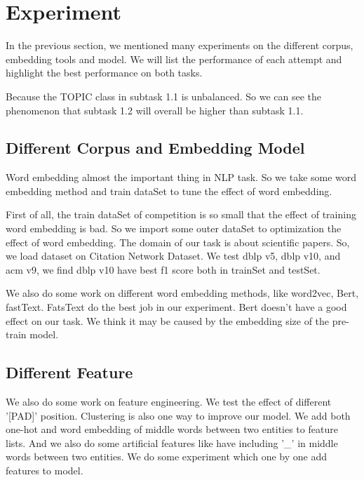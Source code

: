 \section{Experiment}
\label{sec:experiment}

In the previous section, we mentioned many experiments on the different corpus, embedding tools and model. We will list the performance of each attempt and highlight the best performance on both tasks.

Because the TOPIC class in subtask 1.1 is unbalanced. So we can see the phenomenon that subtask 1.2 will overall be higher than subtask 1.1.

\subsection{Different Corpus and Embedding Model}
\label{sec:different_corpus_and_embedding_model}

Word embedding almost the important thing in NLP task. So we take some word embedding method and train dataSet to tune the effect of word embedding.

First of all, the train dataSet of competition is so small that the effect of training word embedding is bad. So we import some outer dataSet to optimization the effect of word embedding. The domain of our task is about scientific papers. So, we load dataset on Citation Network Dataset. We test dblp v5, dblp v10, and acm v9, we find dblp v10 have best f1 score both in trainSet and testSet.

We also do some work on different word embedding methods, like word2vec, Bert, fastText. FatsText do the best job in our experiment. Bert doesn't have a good effect on our task. We think it may be caused by the embedding size of the pre-train model.



\subsection{Different Feature}
\label{sec:different_feature}

We also do some work on feature engineering. We test the effect of different '[PAD]' position. Clustering is also one way to improve our model. We add both one-hot and word embedding of middle words between two entities to feature lists. And we also do some artificial features like have including '\_' in middle words between two entities. We do some experiment which one by one add features to model.

